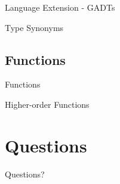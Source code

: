\documentclass[xcolor={usenames,dvipsnames}]{beamer}
\begin{document}
\begin{frame}[fragile]{Language Extension - GADTs}
\end{frame}

\begin{frame}[fragile]{Type Synonyms}
\end{frame}


\subsection{Functions}

\begin{frame}[fragile]{Functions}
\end{frame}

\begin{frame}[fragile]{Higher-order Functions}
\end{frame}


\section{Questions}

\begin{frame}
  Questions?
\end{frame}
\end{document}
